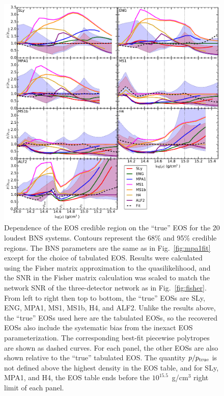 \documentclass[twocolumn,prd,amssymb,aps,nofootinbib,showpacs,epsf]{revtex4}
\begin{document}
\begin{figure}[!htb]
\begin{center}
\includegraphics[width=6.4in]{perroralleos.pdf}
\caption{Dependence of the EOS credible region on the ``true'' EOS for the 20 loudest BNS systems. Contours represent the 68\% and 95\% credible regions. The BNS parameters are the same as in Fig.~\ref{fig:mpa1fit} except for the choice of tabulated EOS. Results were calculated using the Fisher matrix approximation to the quasilikelihood, and the SNR in the Fisher matrix calculation was scaled to match the network SNR of the three-detector network as in Fig.~\ref{fig:fisher}. From left to right then top to bottom, the ``true'' EOSs are SLy, ENG, MPA1, MS1, MS1b, H4, and ALF2. Unlike the results above, the ``true'' EOSs used here are the tabulated EOSs, so the recovered EOSs also include the systematic bias from the inexact EOS parameterization. The corresponding best-fit piecewise polytropes are shown as dashed curves. For each panel, the other EOSs are also shown relative to the ``true'' tabulated EOS. The quantity $p/p_{\rm true}$ is not defined above the highest density in the EOS table, and for SLy, MPA1, and H4, the EOS table ends before the $10^{15.5}$~g/cm$^3$ right limit of each panel.}
\label{fig:perroralleos}
\end{center}
\end{figure}
\end{document}

